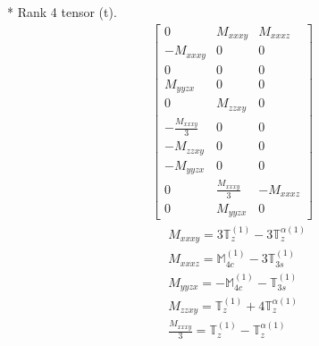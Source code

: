 \documentclass[fleqn,8pt,landscape]{jsarticle}
\begin{document}
* Rank 4 tensor (t).
\begin{align*}
\begin{bmatrix} 0 & M_{xxxy} & M_{xxxz} \\ - M_{xxxy} & 0 & 0 \\ 0 & 0 & 0 \\ M_{yyzx} & 0 & 0 \\ 0 & M_{zzxy} & 0 \\ - \frac{M_{xxxy}}{3} & 0 & 0 \\ - M_{zzxy} & 0 & 0 \\ - M_{yyzx} & 0 & 0 \\ 0 & \frac{M_{xxxy}}{3} & - M_{xxxz} \\ 0 & M_{yyzx} & 0 \end{bmatrix}
\end{align*}
\begin{align*}
& M_{xxxy} = 3 \mathbb{T}_{z}^{(1)} - 3 \mathbb{T}_{z}^{\alpha(1)} \\
& M_{xxxz} = \mathbb{M}_{4c}^{(1)} - 3 \mathbb{T}_{3s}^{(1)} \\
& M_{yyzx} = - \mathbb{M}_{4c}^{(1)} - \mathbb{T}_{3s}^{(1)} \\
& M_{zzxy} = \mathbb{T}_{z}^{(1)} + 4 \mathbb{T}_{z}^{\alpha(1)} \\
& \frac{M_{xxxy}}{3} = \mathbb{T}_{z}^{(1)} - \mathbb{T}_{z}^{\alpha(1)}
\end{align*}
\end{document}
